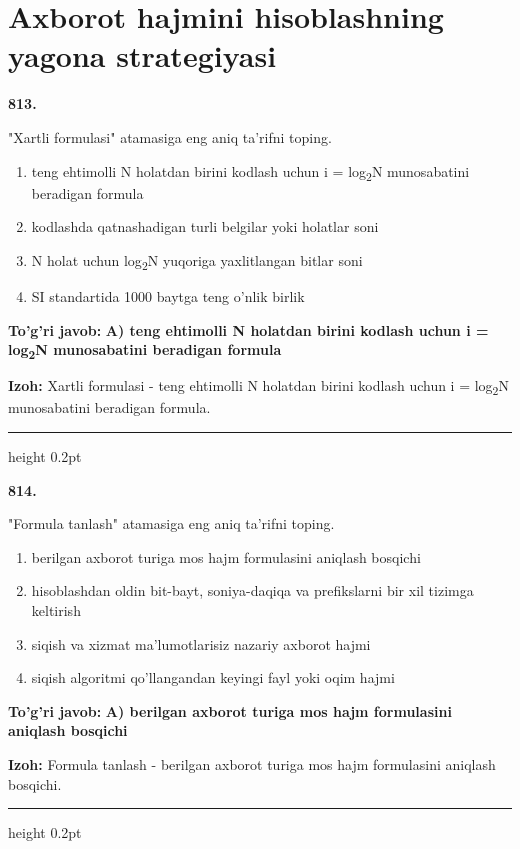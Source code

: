 \documentclass[10pt,a4paper,oneside]{article}
\begin{document}
\section{Axborot hajmini hisoblashning yagona strategiyasi}

\noindent\textbf{\color{ink}813.}
\par
"Xartli formulasi" atamasiga eng aniq ta'rifni toping.
\begin{enumerate}[label=\Alph*),leftmargin=9mm]
\item teng ehtimolli N holatdan birini kodlash uchun i = log\textsubscript{2}N munosabatini beradigan formula
\item kodlashda qatnashadigan turli belgilar yoki holatlar soni
\item N holat uchun log\textsubscript{2}N yuqoriga yaxlitlangan bitlar soni
\item SI standartida 1000 baytga teng o'nlik birlik
\end{enumerate}
\begin{tcolorbox}[enhanced,breakable,colback=teal!4,colframe=teal!50!black,boxrule=0.5pt,arc=1.1mm,left=3mm,right=3mm,top=1.7mm,bottom=1.7mm,before skip=2mm,after skip=2mm]
\textbf{\color{teal}To'g'ri javob:} \textbf{A) teng ehtimolli N holatdan birini kodlash uchun i = log\textsubscript{2}N munosabatini beradigan formula}
\par\smallskip
\textbf{Izoh:} Xartli formulasi - teng ehtimolli N holatdan birini kodlash uchun i = log\textsubscript{2}N munosabatini beradigan formula.
\end{tcolorbox}
\vspace{2mm}\hrule height 0.2pt \vspace{3mm}

\noindent\textbf{\color{ink}814.}
\par
"Formula tanlash" atamasiga eng aniq ta'rifni toping.
\begin{enumerate}[label=\Alph*),leftmargin=9mm]
\item berilgan axborot turiga mos hajm formulasini aniqlash bosqichi
\item hisoblashdan oldin bit-bayt, soniya-daqiqa va prefikslarni bir xil tizimga keltirish
\item siqish va xizmat ma'lumotlarisiz nazariy axborot hajmi
\item siqish algoritmi qo'llangandan keyingi fayl yoki oqim hajmi
\end{enumerate}
\begin{tcolorbox}[enhanced,breakable,colback=teal!4,colframe=teal!50!black,boxrule=0.5pt,arc=1.1mm,left=3mm,right=3mm,top=1.7mm,bottom=1.7mm,before skip=2mm,after skip=2mm]
\textbf{\color{teal}To'g'ri javob:} \textbf{A) berilgan axborot turiga mos hajm formulasini aniqlash bosqichi}
\par\smallskip
\textbf{Izoh:} Formula tanlash - berilgan axborot turiga mos hajm formulasini aniqlash bosqichi.
\end{tcolorbox}
\vspace{2mm}\hrule height 0.2pt \vspace{3mm}
\end{document}
